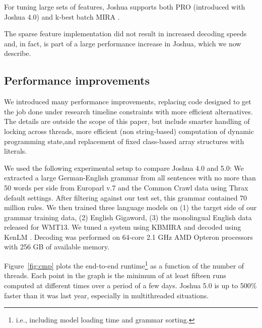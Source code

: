 \documentclass[11pt]{article}
\begin{document}
For tuning large sets of features, Joshua supports both PRO
\cite{PRO2011} (introduced with Joshua 4.0) and k-best batch MIRA
\cite{cherry2012batch}.

The sparse feature implementation did not result in increased decoding
speeds and, in fact, is part of a large performance increase in
Joshua, which we now describe.

\subsection{Performance improvements}

We introduced many performance improvements, replacing code designed
to get the job done under research timeline constraints with more
efficient alternatives. The details are outside the scope of this
paper, but include smarter handling of locking across threads, more
efficient (non string-based) computation of dynamic programming state,and
replacement of fixed class-based array structures with literals.

We used the following experimental setup to compare Joshua 4.0 and
5.0: We extracted a large German-English grammar from all sentences
with no more than 50 words per side from Europarl v.7 and the Common
Crawl data using Thrax default settings.  After filtering against our
test set, this grammar contained 70 million rules.  We then trained
three language models on (1) the target side of our grammar training
data, (2) English Gigaword, (3) the monolingual English data released
for WMT13. We tuned a system using KBMIRA and decoded using KenLM
\cite{KenLM}.  Decoding was performed on 64-core 2.1 GHz AMD Opteron
processors with 256 GB of available memory.

Figure~\ref{fig:cmp} plots the end-to-end runtime\footnote{i.e.,
  including model loading time and grammar sorting.} as a function of
the number of threads.  Each point in the graph is the minimum of at
least fifteen runs computed at different times over a period of a few
days.  Joshua 5.0 is up to 500\% faster than it was last year,
especially in multithreaded situations.
\end{document}
